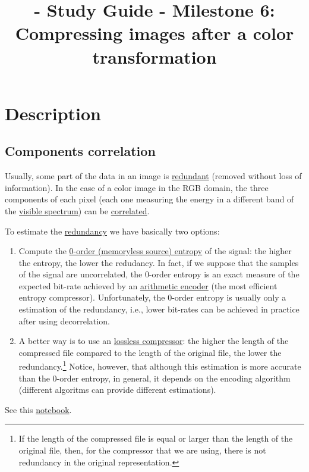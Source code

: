 

\title{\SM{} - Study Guide - Milestone 6: Compressing images after a color transformation}

\maketitle

\tableofcontents

\section{Description}

\subsection{Components correlation}
Usually, some part of the data in an image is
\href{https://en.wikipedia.org/wiki/Data_redundancy}{redundant}
(removed without loss of information). In the case of a color image in
the RGB domain, the three components of each pixel (each one measuring
the energy in a different band of the
\href{https://en.wikipedia.org/wiki/Visible_spectrum}{visible
  spectrum}) can be
\href{https://en.wikipedia.org/wiki/Correlation_and_dependence}{correlated}.

To estimate the
\href{https://en.wikipedia.org/wiki/Redundancy_(information_theory)}{redundancy}
we have basically two options:
\begin{enumerate}
\item Compute the
  \href{https://en.wikipedia.org/wiki/Entropy_(information_theory)}{0-order
    (memoryless source) entropy} of the signal: the higher the
  entropy, the lower the redudancy. In fact, if we suppose that the
  samples of the signal are uncorrelated, the 0-order entropy is an
  exact measure of the expected bit-rate achieved by an
  \href{https://en.wikipedia.org/wiki/Arithmetic_coding}{arithmetic
    encoder} (the most efficient entropy compressor). Unfortunately,
  the 0-order entropy is usually only a estimation of the redundancy,
  i.e., lower bit-rates can be achieved in practice after using
  decorrelation.
\item A better way is to use an
  \href{https://en.wikipedia.org/wiki/Data_compression}{lossless
    compressor}: the higher the length of the compressed file compared
  to the length of the original file, the lower the
  redundancy.\footnote{If the length of the compressed file is equal or
  larger than the length of the original file, then, for the compressor
  that we are using, there is not redundancy in the original
  representation.} Notice, however, that although this estimation is
  more accurate than the 0-order entropy, in general, it depends on the
  encoding algorithm (different algoritms can provide different
  estimations).
\end{enumerate}
See this
\href{https://github.com/Sistemas-Multimedia/Sistemas-Multimedia.github.io/blob/master/milestones/06-YUV_compression/color_redundancy.ipynb}{notebook}.

